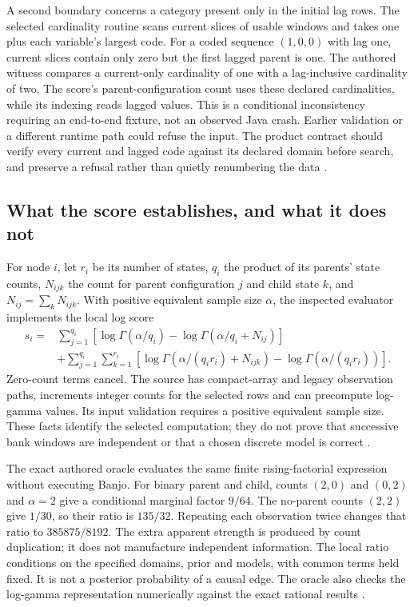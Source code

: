 A second boundary concerns a category present only in the initial lag rows.
The selected cardinality routine scans current slices of usable windows and
takes one plus each variable's largest code. For a coded sequence $(1,0,0)$
with lag one, current slices contain only zero but the first lagged parent is
one. The authored witness compares a current-only cardinality of one with a
lag-inclusive cardinality of two. The score's parent-configuration count uses
these declared cardinalities, while its indexing reads lagged values. This
is a conditional inconsistency requiring an end-to-end fixture, not an
observed Java crash. Earlier validation or a different runtime path could
refuse the input. The product contract should verify every current and lagged
code against its declared domain before search, and preserve a refusal rather
than quietly renumbering the data \citep{exec24_banjo_source,exec24_banjo_choice}.

\subsection{What the score establishes, and what it does not}
For node $i$, let $r_i$ be its number of states, $q_i$ the product of its
parents' state counts, $N_{ijk}$ the count for parent configuration $j$ and
child state $k$, and $N_{ij}=\sum_kN_{ijk}$. With positive equivalent sample
size $\alpha$, the inspected evaluator implements the local log score
\begin{align*}
 s_i={}&\sum_{j=1}^{q_i}\left[\log\Gamma(\alpha/q_i)
                  -\log\Gamma(\alpha/q_i+N_{ij})\right]\\
 &+\sum_{j=1}^{q_i}\sum_{k=1}^{r_i}
       \left[\log\Gamma(\alpha/(q_ir_i)+N_{ijk})
                  -\log\Gamma(\alpha/(q_ir_i))\right].
\end{align*}
Zero-count terms cancel. The source has compact-array and legacy observation
paths, increments integer counts for the selected rows and can precompute
log-gamma values. Its input validation requires a positive equivalent sample
size. These facts identify the selected computation; they do not prove that
successive bank windows are independent or that a chosen discrete model is
correct \citep{exec24_banjo_source}.

The exact authored oracle evaluates the same finite rising-factorial
expression without executing Banjo. For binary parent and child, counts
$(2,0)$ and $(0,2)$ and $\alpha=2$ give a conditional marginal factor $9/64$.
The no-parent counts $(2,2)$ give $1/30$, so their ratio is $135/32$.
Repeating each observation twice changes that ratio to $385875/8192$.
The extra apparent strength is produced by count duplication; it does not
manufacture independent information. The local ratio conditions on the
specified domains, prior and models, with common terms held fixed. It is
not a posterior probability of a causal edge. The oracle also checks the
log-gamma representation numerically against the exact rational results
\citep{exec24_banjo_choice}.

